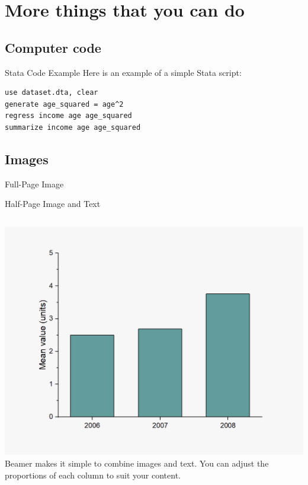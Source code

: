 \documentclass[aspectratio=169]{beamer} %
\begin{document}
	
	
\section{More things that you can do}
	
	\subsection{Computer code}
	
	\begin{frame}[fragile]{Stata Code Example}%
	Here is an example of a simple Stata script:
\begin{lstlisting}
use dataset.dta, clear
generate age_squared = age^2
regress income age age_squared
summarize income age age_squared
\end{lstlisting}

	\end{frame}
	
	\subsection{Images}
	
	\begin{frame}{Full-Page Image}
	\end{frame}
	
	\begin{frame}{Half-Page Image and Text}
		\begin{columns}
			\includegraphics[width=\textwidth]{generic_bargraph.png}
			Beamer makes it simple to combine images and text. You can adjust the proportions of each column to suit your content.
		\end{columns}
	\end{frame}
\end{document}
